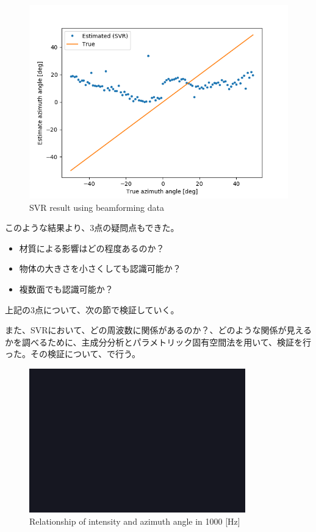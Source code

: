 \begin{figure}[ht]
  \begin{center}
  \vspace{1zh}
    \includegraphics[width=0.6\linewidth]{images/3_svr_191015_PTs01_beam.png}   
  \end{center}
  \caption{SVR result using beamforming data}
  \label{fig:exp_beam_check}
\end{figure}

このような結果より、3点の疑問点もできた。
\begin{itemize}
    \item 材質による影響はどの程度あるのか？
    \item 物体の大きさを小さくしても認識可能か？
    \item 複数面でも認識可能か？
\end{itemize}
上記の3点について、次の節で検証していく。

また、SVRにおいて、どの周波数に関係があるのか？、どのような関係が見えるかを調べるために、主成分分析とパラメトリック固有空間法を用いて、検証を行った。その検証について、で行う。

\begin{figure}[ht]
  \begin{center}
  \vspace{1zh}
    \includegraphics[width=0.5\linewidth]{images/fig_sample.png}   
  \end{center}
  \caption{Relationship of intensity and azimuth angle in 1000 [Hz]}
  \label{fig:relation_intensity_azimuth}
\end{figure}
\fi


